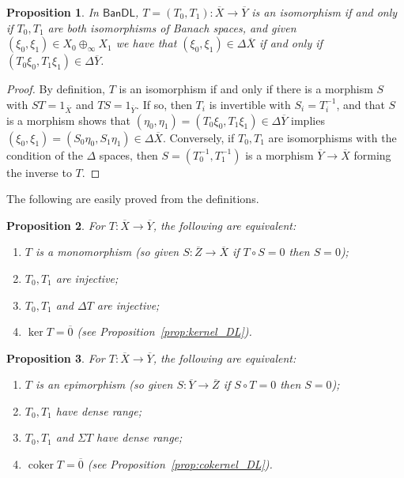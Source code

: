 \documentclass[a4paper,11pt]{article}
\theoremstyle{plain}
\newtheorem{proposition}{Proposition}[section]
\theoremstyle{remark}
\newcommand{\msf}[1]{\mathsf{#1}}
\newcommand{\coker}{\operatorname{coker}}
\begin{document}
\begin{proposition}\label{prop:isomorphism_DL}
In $\msf{BanDL}$, $T=(T_0,T_1) \colon \overline X \to \overline Y$ is an isomorphism if and only if $T_0,T_1$ are both isomorphisms of Banach spaces, and given $(\xi_0,\xi_1) \in X_0\oplus_\infty X_1$ we have that $(\xi_0,\xi_1) \in \Delta\overline X$ if and only if $(T_0\xi_0, T_1\xi_1) \in \Delta\overline Y$.
\end{proposition}
\begin{proof}
By definition, $T$ is an isomorphism if and only if there is a morphism $S$ with $ST = 1_{\overline X}$ and $TS = 1_{\overline Y}$.  If so, then $T_i$ is invertible with $S_i = T_i^{-1}$, and that $S$ is a morphism shows that $(\eta_0, \eta_1) = (T_0\xi_0, T_1\xi_1) \in \Delta\overline Y$ implies $(\xi_0,\xi_1) = (S_0\eta_0, S_1\eta_1)\in\Delta\overline X$.  Conversely, if $T_0,T_1$ are isomorphisms with the condition of the $\Delta$ spaces, then $S = (T_0^{-1}, T_1^{-1})$ is a morphism $\overline Y\to\overline X$ forming the inverse to $T$.
\end{proof}

The following are easily proved from the definitions.

\begin{proposition}\label{prop:monomorphism_DL}
For $T\colon\overline X\to\overline Y$, the following are equivalent:
\begin{enumerate}
  \item $T$ is a monomorphism (so given $S\colon\overline Z\to\overline X$ if $T\circ S = 0$ then $S=0$);
  \item $T_0, T_1$ are injective;
  \item $T_0, T_1$ and $\Delta T$ are injective;
  \item $\ker T = \overline{0}$ (see Proposition~\ref{prop:kernel_DL}).
\end{enumerate}
\end{proposition}

\begin{proposition}\label{prop:epimorphism_DL}
For $T\colon\overline X\to\overline Y$, the following are equivalent:
\begin{enumerate}
  \item $T$ is an epimorphism (so given $S\colon\overline Y\to\overline Z$ if $S\circ T = 0$ then $S=0$);
  \item $T_0, T_1$ have dense range;
  \item $T_0, T_1$ and $\Sigma T$ have dense range;
  \item $\coker T = \overline{0}$ (see Proposition~\ref{prop:cokernel_DL}).
\end{enumerate}
\end{proposition}
\end{document}
